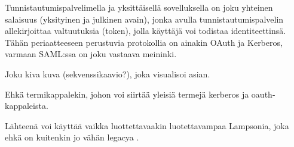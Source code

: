 Tunnistautumispalvelimella ja yksittäisellä sovelluksella on joku yhteinen salaisuus (yksityinen ja julkinen avain), jonka avulla tunnistautumispalvelin allekirjoittaa valtuutuksia (token), jolla käyttäjä voi todistaa identiteettinsä. Tähän periaatteeseen perustuvia protokollia on ainakin OAuth ja Kerberos, varmaan SAML:ssa on joku vastaava meininki.

Joku kiva kuva (sekvenssikaavio?), joka visualisoi asian.

Ehkä termikappalekin, johon voi siirtää yleisiä termejä kerberos ja oauth-kappaleista.

Lähteenä voi käyttää vaikka luottettavaakin luotettavampaa Lampsonia, joka ehkä on kuitenkin jo vähän legacya \cite{lampson}.